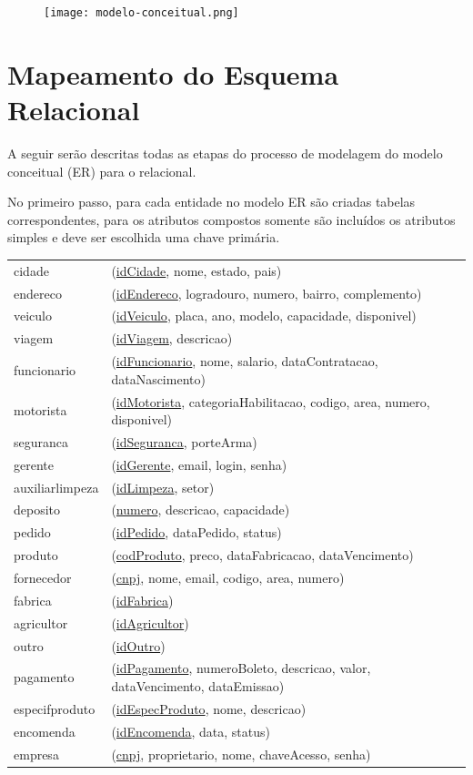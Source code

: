 \documentclass[12pt, onecolumn, titlepage]{article}
\begin{document}
\newpage

\begin{figure}[H]
  \centering
  \texttt{[image: modelo-conceitual.png]}
  \label{figRotulo}
\end{figure}

\newpage
\section{Mapeamento do Esquema Relacional}
\label{sect:relacional}
A seguir serão descritas todas as etapas do processo de modelagem do modelo conceitual (ER) para o relacional.

No primeiro passo, para cada entidade no modelo ER são criadas tabelas correspondentes, para os atributos compostos somente são incluídos os atributos simples e deve ser escolhida uma chave primária.
\\
\renewcommand{\baselinestretch}{1.2}
\begin{table}[htb!]
\begin{center}
\begin{tabular}{p{2.5cm} p{10.5cm}}
cidade & (\underline{idCidade}, nome, estado, pais) \\
endereco & (\underline{idEndereco}, logradouro, numero, bairro, complemento) \\
veiculo & (\underline{idVeiculo}, placa, ano, modelo, capacidade, disponivel) \\
viagem & (\underline{idViagem}, descricao) \\
funcionario & (\underline{idFuncionario}, nome, salario, dataContratacao, dataNascimento)\\
motorista & (\underline{idMotorista}, categoriaHabilitacao, codigo, area, numero, disponivel)\\
seguranca & (\underline{idSeguranca}, porteArma)\\
gerente & (\underline{idGerente}, email, login, senha)\\
auxiliarlimpeza & (\underline{idLimpeza}, setor)\\
deposito & (\underline{numero}, descricao, capacidade)\\
pedido & (\underline{idPedido}, dataPedido, status)\\
produto & (\underline{codProduto}, preco, dataFabricacao, dataVencimento)\\
fornecedor & (\underline{cnpj}, nome, email, codigo, area, numero)\\
fabrica & (\underline{idFabrica})\\
agricultor & (\underline{idAgricultor})\\
outro & (\underline{idOutro})\\
pagamento & (\underline{idPagamento}, numeroBoleto, descricao, valor, dataVencimento, dataEmissao)\\
especifproduto & (\underline{idEspecProduto}, nome, descricao)\\
encomenda & (\underline{idEncomenda}, data, status)\\
empresa & (\underline{cnpj}, proprietario, nome, chaveAcesso, senha)
\end{tabular}
\end{center}
\end{table}
\end{document}

